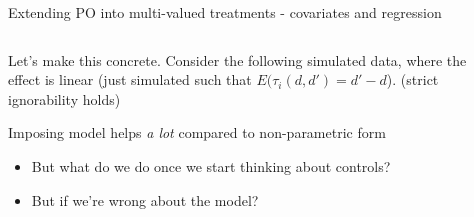 \documentclass[notes,11pt, aspectratio=169]{beamer}
\newenvironment{wideitemize}{\itemize\addtolength{\itemsep}{10pt}}{\enditemize}
\begin{document}
\begin{frame}{Extending PO into multi-valued treatments - covariates and regression}
\begin{columns}[T] %
  \begin{column}{.4\textwidth}
  \begin{wideitemize}
  \item<1-> Let's make this concrete. Consider the following simulated
    data, where the effect is linear (just simulated such that
    $E(\tau_{i}(d, d') = d'-d$). (strict ignorability holds)
  \item<2-> Imposing model helps \emph{a lot} compared to non-parametric form
    \begin{itemize}
    \item But what do we do once we start thinking about controls?
    \item But if we're wrong about the model?
    \end{itemize}
\end{wideitemize}    

\end{column}%
  \hfill%
  \begin{column}{.6\textwidth}
  \end{column}
\end{columns}
\end{frame}
\end{document}
